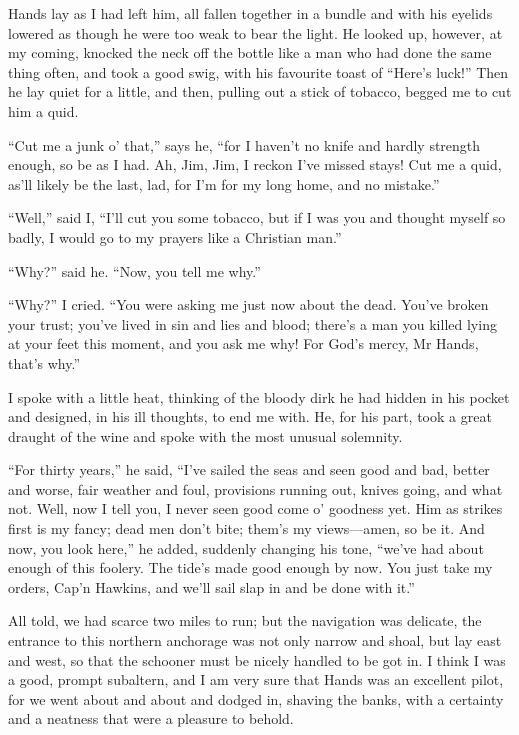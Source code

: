 Hands lay as I had left him, all fallen together in a bundle and with his eyelids lowered as though he were too weak to bear the light. He looked up, however, at my coming, knocked the neck off the bottle like a man who had done the same thing often, and took a good swig, with his favourite toast of \enquote{Here’s luck!} Then he lay quiet for a little, and then, pulling out a stick of tobacco, begged me to cut him a quid.

\enquote{Cut me a junk o’ that,} says he, \enquote{for I haven’t no knife and hardly strength enough, so be as I had. Ah, Jim, Jim, I reckon I’ve missed stays! Cut me a quid, as’ll likely be the last, lad, for I’m for my long home, and no mistake.}

\enquote{Well,} said I, \enquote{I’ll cut you some tobacco, but if I was you and thought myself so badly, I would go to my prayers like a Christian man.}

\enquote{Why?} said he. \enquote{Now, you tell me why.}

\enquote{Why?} I cried. \enquote{You were asking me just now about the dead. You’ve broken your trust; you’ve lived in sin and lies and blood; there’s a man you killed lying at your feet this moment, and you ask me why! For God’s mercy, Mr Hands, that’s why.}

I spoke with a little heat, thinking of the bloody dirk he had hidden in his pocket and designed, in his ill thoughts, to end me with. He, for his part, took a great draught of the wine and spoke with the most unusual solemnity.

\enquote{For thirty years,} he said, \enquote{I’ve sailed the seas and seen good and bad, better and worse, fair weather and foul, provisions running out, knives going, and what not. Well, now I tell you, I never seen good come o’ goodness yet. Him as strikes first is my fancy; dead men don’t bite; them’s my views---amen, so be it. And now, you look here,} he added, suddenly changing his tone, \enquote{we’ve had about enough of this foolery. The tide’s made good enough by now. You just take my orders, Cap’n Hawkins, and we’ll sail slap in and be done with it.}

All told, we had scarce two miles to run; but the navigation was delicate, the entrance to this northern anchorage was not only narrow and shoal, but lay east and west, so that the schooner must be nicely handled to be got in. I think I was a good, prompt subaltern, and I am very sure that Hands was an excellent pilot, for we went about and about and dodged in, shaving the banks, with a certainty and a neatness that were a pleasure to behold.

